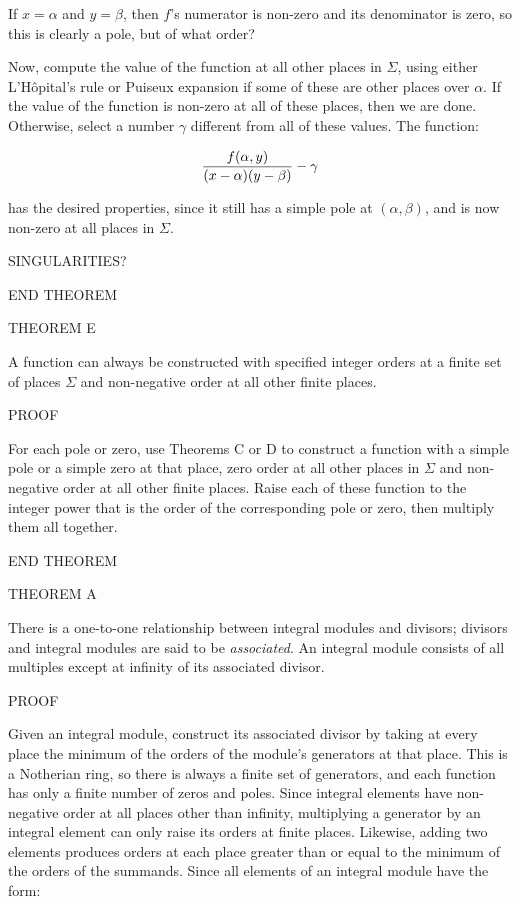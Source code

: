 If $x=\alpha$ and $y=\beta$, then $f$'s numerator is non-zero and its
denominator is zero, so this is clearly a pole, but of what order?

Now, compute the value of the function at all other places in
$\Sigma$, using either L'H\^opital's rule or Puiseux expansion if some
of these are other places over $\alpha$.  If the value of the function
is non-zero at all of these places, then we are done.  Otherwise,
select a number $\gamma$ different from all of these values.  The
function:

$${f(\alpha,y)\over(x-\alpha)(y-\beta)} - \gamma$$

has the desired properties, since it still has a simple pole at
$(\alpha,\beta)$, and is now non-zero at all places in $\Sigma$.

SINGULARITIES?

END THEOREM

THEOREM E

A function can always be constructed with specified integer orders at
a finite set of places $\Sigma$ and non-negative order at all other finite
places.

PROOF

For each pole or zero, use Theorems C or D to construct a function
with a simple pole or a simple zero at that place, zero order at all
other places in $\Sigma$ and non-negative order at all other finite
places.  Raise each of these function to the integer power that is the
order of the corresponding pole or zero, then multiply them all
together.

END THEOREM

THEOREM A

There is a one-to-one relationship between integral modules and
divisors; divisors and integral modules are said to be {\it
associated}.  An integral module consists of all multiples except at
infinity of its associated divisor.


PROOF

Given an integral module, construct its associated divisor by taking
at every place the minimum of the orders of the module's generators at
that place.  This is a Notherian ring, so there is always a finite set
of generators, and each function has only a finite number of zeros and
poles.  Since integral elements have non-negative order at all places
other than infinity, multiplying a generator by an integral element
can only raise its orders at finite places.  Likewise, adding two
elements produces orders at each place greater than or equal to the
minimum of the orders of the summands.  Since all elements of an
integral module have the form:

